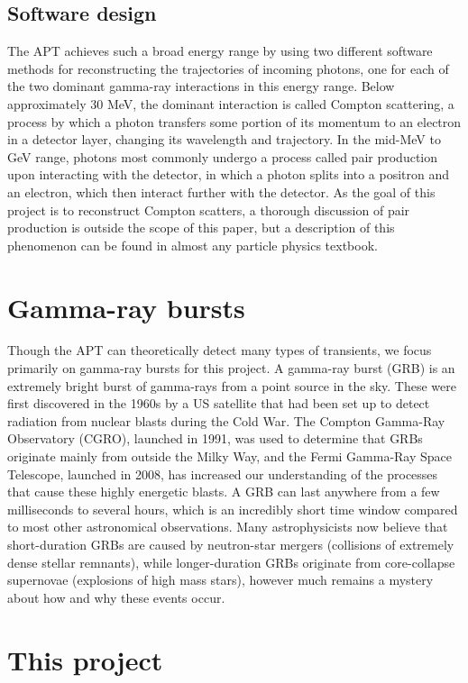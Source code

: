 \subsection{Software design}
The APT achieves such a broad energy range by using two different software methods for reconstructing the trajectories of incoming photons, one for each of the two dominant gamma-ray interactions in this energy range. Below approximately 30 MeV, the dominant interaction is called Compton scattering, a process by which a photon transfers some portion of its momentum to an electron in a detector layer, changing its wavelength and trajectory. In the mid-MeV to GeV range, photons most commonly undergo a process called pair production upon interacting with the detector, in which a photon splits into a positron and an electron, which then interact further with the detector. As the goal of this project is to reconstruct Compton scatters, a thorough discussion of pair production is outside the scope of this paper, but a description of this phenomenon can be found in almost any particle physics textbook.

\section{Gamma-ray bursts}
Though the APT can theoretically detect many types of transients, we focus primarily on gamma-ray bursts for this project. A gamma-ray burst (GRB) is an extremely bright burst of gamma-rays from a point source in the sky. These were first discovered in the 1960s by a US satellite that had been set up to detect radiation from nuclear blasts during the Cold War. The Compton Gamma-Ray Observatory (CGRO), launched in 1991, was used to determine that GRBs originate mainly from outside the Milky Way, and the Fermi Gamma-Ray Space Telescope, launched in 2008, has increased our understanding of the processes that cause these highly energetic blasts. A GRB can last anywhere from a few milliseconds to several hours, which is an incredibly short time window compared to most other astronomical observations. Many astrophysicists now believe that short-duration GRBs are caused by neutron-star mergers (collisions of extremely dense stellar remnants), while longer-duration GRBs originate from core-collapse supernovae (explosions of high mass stars), however much remains a mystery about how and why these events occur.

\section{This project}
